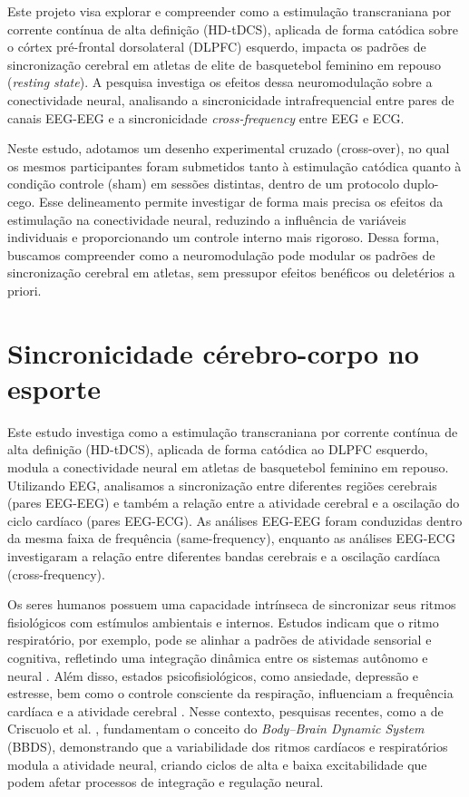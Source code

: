 Este projeto visa explorar e compreender como a estimulação transcraniana por corrente contínua de alta definição (HD-tDCS), aplicada de forma catódica sobre o córtex pré-frontal dorsolateral (DLPFC) esquerdo, impacta os padrões de sincronização cerebral em atletas de elite de basquetebol feminino em repouso (\textit{resting state}). A pesquisa investiga os efeitos dessa neuromodulação sobre a conectividade neural, analisando a sincronicidade intrafrequencial entre pares de canais EEG-EEG e a sincronicidade \textit{cross-frequency} entre EEG e ECG. 

Neste estudo, adotamos um desenho experimental cruzado (cross-over), no qual os mesmos participantes foram submetidos tanto à estimulação catódica quanto à condição controle (sham) em sessões distintas, dentro de um protocolo duplo-cego. Esse delineamento permite investigar de forma mais precisa os efeitos da estimulação na conectividade neural, reduzindo a influência de variáveis individuais e proporcionando um controle interno mais rigoroso. Dessa forma, buscamos compreender como a neuromodulação pode modular os padrões de sincronização cerebral em atletas, sem pressupor efeitos benéficos ou deletérios a priori.

\section{Sincronicidade cérebro-corpo no esporte}  
Este estudo investiga como a estimulação transcraniana por corrente contínua de alta definição (HD-tDCS), aplicada de forma catódica ao DLPFC esquerdo, modula a conectividade neural em atletas de basquetebol feminino em repouso. Utilizando EEG, analisamos a sincronização entre diferentes regiões cerebrais (pares EEG-EEG) e também a relação entre a atividade cerebral e a oscilação do ciclo cardíaco (pares EEG-ECG). As análises EEG-EEG foram conduzidas dentro da mesma faixa de frequência (same-frequency), enquanto as análises EEG-ECG investigaram a relação entre diferentes bandas cerebrais e a oscilação cardíaca (cross-frequency).

Os seres humanos possuem uma capacidade intrínseca de sincronizar seus ritmos fisiológicos com estímulos ambientais e internos. Estudos indicam que o ritmo respiratório, por exemplo, pode se alinhar a padrões de atividade sensorial e cognitiva, refletindo uma integração dinâmica entre os sistemas autônomo e neural \cite{haas1985effects}. Além disso, estados psicofisiológicos, como ansiedade, depressão e estresse, bem como o controle consciente da respiração, influenciam a frequência cardíaca e a atividade cerebral \cite{criscuolo2022cognition}. Nesse contexto, pesquisas recentes, como a de Criscuolo et al. \cite{criscuolo2022cognition}, fundamentam o conceito do \textit{Body–Brain Dynamic System} (BBDS), demonstrando que a variabilidade dos ritmos cardíacos e respiratórios modula a atividade neural, criando ciclos de alta e baixa excitabilidade que podem afetar processos de integração e regulação neural.

